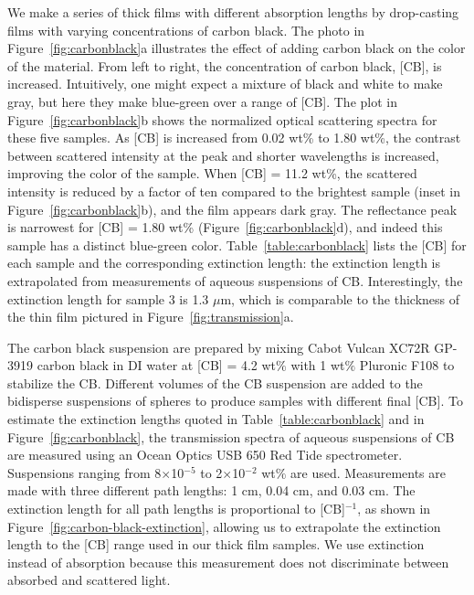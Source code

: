 We make a series of thick films with different absorption lengths by drop-casting films with varying concentrations of carbon black.
The photo in Figure~\ref{fig:carbonblack}a illustrates the effect of adding carbon black on the color of the material.
From left to right, the concentration of carbon black, [CB], is increased.
Intuitively, one might expect a mixture of black and white to make gray, but here they make blue-green over a range of [CB].
The plot in Figure~\ref{fig:carbonblack}b shows the normalized optical scattering spectra for these five samples.
As [CB] is increased from 0.02 wt\% to 1.80 wt\%, the contrast between scattered intensity at the peak and shorter wavelengths is increased, improving the color of the sample.
When [CB] = 11.2 wt\%, the scattered intensity is reduced by a factor of ten compared to the brightest sample (inset in Figure~\ref{fig:carbonblack}b), and the film appears dark gray.
The reflectance peak is narrowest for [CB] = 1.80 wt\% (Figure~\ref{fig:carbonblack}d), and indeed this sample has a distinct blue-green color.
Table~\ref{table:carbonblack} lists the [CB] for each sample and the corresponding extinction length: the extinction length is extrapolated from measurements of aqueous suspensions of CB.
Interestingly, the extinction length for sample 3 is 1.3 $\mu$m, which is comparable to the thickness of the thin film pictured in Figure~\ref{fig:transmission}a.

The carbon black suspension are prepared by mixing Cabot Vulcan XC72R GP-3919 carbon black in DI water at [CB] = 4.2 wt$\%$ with 1 wt$\%$ Pluronic F108 to stabilize the CB.  
Different volumes of the CB suspension are added to the bidisperse suspensions of spheres to produce samples with different final [CB].
To estimate the extinction lengths quoted in Table~\ref{table:carbonblack} and in Figure~\ref{fig:carbonblack}, the transmission spectra of aqueous suspensions of CB are measured using an Ocean Optics USB 650 Red Tide spectrometer.
Suspensions ranging from 8$\times$10$^{-5}$ to 2$\times$10$^{-2}$ wt$\%$ are used.  
Measurements are made with three different path lengths: 1 cm, 0.04 cm, and 0.03 cm.
The extinction length for all path lengths is proportional to [CB]$^{-1}$, as shown in Figure~\ref{fig:carbon-black-extinction}, allowing us to extrapolate the extinction length to the [CB] range used in our thick film samples.
We use extinction instead of absorption because this measurement does not discriminate between absorbed and scattered light.

